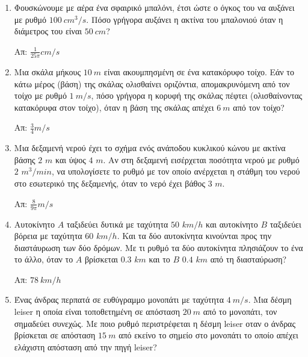 







\pagestyle{empty}

\begin{center}
  \minibox{\large \bfseries \textcolor{Col1}{Προβλήματα στο ρυθμό μεταβολής}}
\end{center}

\vspace{\baselineskip}

\begin{enumerate}
  \item  Φουσκώνουμε με αέρα ένα σφαιρικό μπαλόνι, έτσι
    ώστε ο όγκος του να αυξάνει με ρυθμό $\SI{100}{cm^{3}\per s}$. Πόσο γρήγορα
    αυξάνει η ακτίνα του μπαλονιού όταν η διάμετρος του είναι $\SI{50}{cm}$?

    \hfill Απ: $\frac{1}{25\pi}\si{cm\per s}$


  \item  Μια σκάλα μήκους $\SI{10}{m}$ είναι ακουμπησμένη
    σε ένα κατακόρυφο τοίχο. Εάν το κάτω μέρος (βάση) της σκάλας ολισθαίνει
    οριζόντια, απομακρυνόμενη από τον τοίχο με ρυθμό $\SI{1}{m\per s}$, πόσο
    γρήγορα η κορυφή της σκάλας πέφτει (ολισθαίνοντας κατακόρυφα στον τοίχο), όταν η
    βάση της σκάλας απέχει $\SI{6}{m}$ από τον τοίχο?

    \hfill Απ: $\frac{3}{4}\si{m\per s}$

  \item  Μια δεξαμενή νερού έχει το σχήμα ενός ανάποδου
    κυκλικού κώνου με ακτίνα βάσης $2$ $\si{m}$ και ύψος $4$ $\si{m}$. Αν
    στη δεξαμενή εισέρχεται ποσότητα νερού με ρυθμό $2$ $\si{m^{3}/min}$, να
    υπολογίσετε το ρυθμό με τον οποίο ανέρχεται η στάθμη του νερού στο εσωτερικό της
    δεξαμενής, όταν το νερό έχει βάθος $3$ $\si{m}$.

    \hfill Απ: $\frac{8}{9\pi}\si{m\per s}$

  \item   Αυτοκίνητο $A$ ταξιδεύει δυτικά με ταχύτητα $50$
    $\si{km\per h}$ και αυτοκίνητο $B$ ταξιδεύει βόρεια με ταχύτητα $60$
    $\si{km/h}$. Και τα δύο αυτοκίνητα κινούνται προς την διαστάυρωση των δύο δρόμων. 
    Με τι ρυθμό τα δύο αυτοκίνητα πλησιάζουν το ένα το άλλο, όταν το $A$ βρίσκεται $0.3$ 
    $\si{km}$ και το $B$ $0.4$ $\si{km}$ από τη διασταύρωση?

    \hfill Απ: $\SI{78}{km/h}$

  \item  Ένας άνδρας περπατά σε ευθύγραμμο μονοπάτι με
    ταχύτητα $\SI{4}{m/s}$. Μια δέσμη leiser η οποία είναι τοποθετημένη σε απόσταση 
    $\SI{20}{m}$ από το μονοπάτι, τον σημαδεύει συνεχώς. Με ποιο ρυθμό περιστρέφεται η 
    δέσμη leiser οταν ο άνδρας βρίσκεται σε απόσταση $\SI{15}{m}$ από εκείνο το σημείο 
    στο μονοπάτι το οποίο απέχει ελάχιστη απόσταση από την πηγή leiser?


\end{enumerate}
